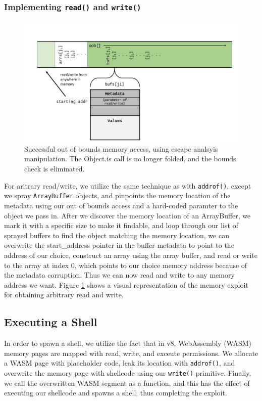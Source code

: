 \documentclass[11pt]{article}
\begin{document}
\subsubsection{Implementing \texttt{read()} and \texttt{write()}}
\begin{figure}
	\centering
	\includegraphics[width=\linewidth]{readmem.jpg}
	\caption{Successful out of bounds memory access, using escape analsyis manipulation. The
	Object.is call is no longer folded, and the bounds check is eliminated.}
  \label{fig:readmem}
\end{figure}
For aritrary read/write, we utilize the same technique as with \texttt{addrof()}, except we spray
\texttt{ArrayBuffer} objects, and pinpoints the memory location of the metadata using our out of
bounds access and a hard-coded paramter to the object we pass in. After we discover the memory
location of an ArrayBuffer, we mark it with a specific size to make it findable, and loop through
our list of sprayed buffers to find the object matching the memory location, we can overwrite the
start\_address pointer in the buffer metadata to point to the address of our choice, construct an
array using the array buffer, and read or write to the array at index 0, which points to our choice
memory address because of the metadata corruption. Thus we can now read and write to any memory
address we want. Figure \ref{fig:readmem} shows a visual representation of the memory exploit for
obtaining arbitrary read and write.

\subsection{Executing a Shell}
In order to spawn a shell, we utilize the fact that in v8, WebAssembly (WASM) memory pages are mapped
with read, write, and exceute permissions. We allocate a WASM page with placeholder code, leak its
location with \texttt{addrof()}, and overwrite the memory page with shellcode using our
\texttt{write()} primitive. Finally, we call the overwritten WASM segment as a function, and this
has the effect of executing our shellcode and spawns a shell, thus completing the exploit.
\end{document}
